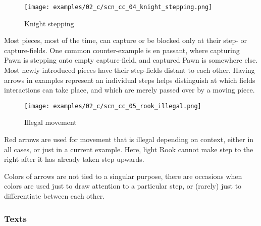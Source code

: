\vspace*{6.7\baselineskip}
\noindent
\begin{wrapfigure}[15]{l}{0.4\textwidth}
\centering
\texttt{[image: examples/02\_c/scn\_cc\_04\_knight\_stepping.png]}
\vspace*{-1.4\baselineskip}
\caption{Knight stepping}
\label{fig:scn_cc_04_knight_stepping}
\end{wrapfigure}
Most pieces, most of the time, can capture or be blocked only at their step- or
capture-fields. One common counter-example is en passant, where capturing Pawn is
stepping onto empty capture-field, and captured Pawn is somewhere else. \newline
\indent
Most newly introduced pieces have their step-fields distant to each other. Having
arrows in examples represent an individual steps helps distinguish at which fields
interactions can take place, and which are merely passed over by a moving piece.

\clearpage %

\vspace*{-1.4\baselineskip}
\noindent
\begin{wrapfigure}[13]{l}{0.4\textwidth}
\centering
\texttt{[image: examples/02\_c/scn\_cc\_05\_rook\_illegal.png]}
\vspace*{-1.4\baselineskip}
\caption{Illegal movement}
\label{fig:scn_cc_05_rook_illegal}
\end{wrapfigure}
Red arrows are used for movement that is illegal depending on context, either
in all cases, or just in a current example. \newline
\indent
Here, light Rook cannot make step to the right after it has already taken step
upwards.

Colors of arrows are not tied to a singular purpose, there are occasions when
colors are used just to draw attention to a particular step, or (rarely) just
to differentiate between each other.


\subsubsection*{Texts}
\label{sec:Classical Chess/Chessboard/Examples/Texts}

